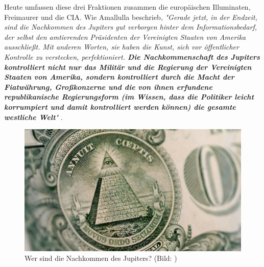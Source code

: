 \documentclass[10pt,twocolumn,letterpaper]{article}
\begin{document}
Heute umfassen diese drei Fraktionen zusammen die europäischen Illuminaten, Freimaurer und die CIA. Wie Amallulla beschrieb, \textit{"Gerade jetzt, in der Endzeit, sind die Nachkommen des Jupiters gut verborgen hinter dem Informationsbedarf, der selbst den amtierenden Präsidenten der Vereinigten Staaten von Amerika ausschließt. Mit anderen Worten, sie haben die Kunst, sich vor öffentlicher Kontrolle zu verstecken, perfektioniert. \textbf{Die Nachkommenschaft des Jupiters kontrolliert nicht nur das Militär und die Regierung der Vereinigten Staaten von Amerika, sondern kontrolliert durch die Macht der Fiatwährung, Großkonzerne und die von ihnen erfundene republikanische Regierungsform (im Wissen, dass die Politiker leicht korrumpiert und damit kontrolliert werden können) die gesamte westliche Welt}"} \cite{33,34}.

\begin{figure}[h]
\begin{center}
   \includegraphics[width=1\linewidth]{illuminati.jpg}
\end{center}
   \caption{Wer sind die Nachkommen des Jupiters? (Bild: \cite{35})}
\label{fig:10}
\label{fig:onecol}
\end{figure}
\end{document}
